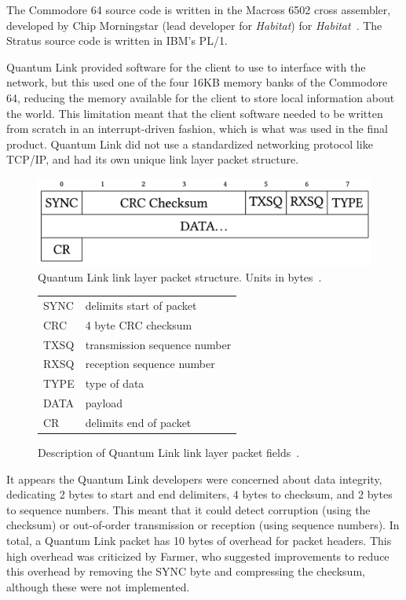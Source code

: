 The Commodore 64 source code is written in the Macross 6502 cross assembler, developed by Chip Morningstar (lead developer for \textit{Habitat}) for \textit{Habitat}~\cite{macrosssrc}. The Stratus source code is written in IBM's PL/1.

Quantum Link provided software for the client to use to interface with the network, but this used one of the four 16KB memory banks of the Commodore 64, reducing the memory available for the client to store local information about the world. This limitation meant that the client software needed to be written from scratch in an interrupt-driven fashion, which is what was used in the final product. Quantum Link did not use a standardized networking protocol like TCP/IP, and had its own unique link layer packet structure.

\begin{figure}[h]
  \includegraphics[scale=0.18]{figures/QLink-Diagram}
  \caption{Quantum Link link layer packet structure. Units in bytes~\cite{habitatsrc}.}
\end{figure}

\begin{figure}[h]
  \begin{tabular}{l l}
    SYNC& delimits start of packet\\
    CRC& 4 byte CRC checksum\\
    TXSQ& transmission sequence number\\
    RXSQ& reception sequence number\\
    TYPE& type of data\\
    DATA& payload\\
    CR& delimits end of packet
  \end{tabular}
  \caption{Description of Quantum Link link layer packet fields~\cite{habitatsrc}.}
\end{figure}

It appears the Quantum Link developers were concerned about data integrity, dedicating 2 bytes to start and end delimiters, 4 bytes to checksum, and 2 bytes to sequence numbers. This meant that it could detect corruption (using the checksum) or out-of-order transmission or reception (using sequence numbers). In total, a Quantum Link packet has 10 bytes of overhead for packet headers. This high overhead was criticized by Farmer, who suggested improvements to reduce this overhead by removing the SYNC byte and compressing the checksum, although these were not implemented.

